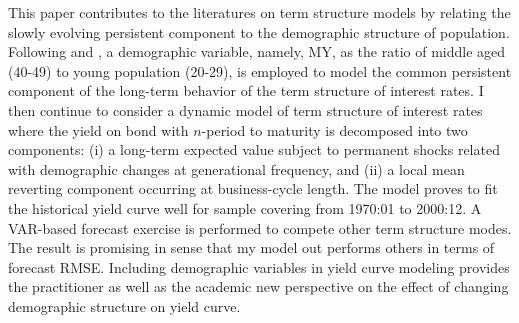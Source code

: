 \begin{englishabstract}
    This paper contributes to the literatures on term structure models by relating the slowly evolving persistent component to the demographic structure of population. Following \cite{geanakoplos2004demography} and \citet{favero2012demographics}, a demographic variable, namely, MY, as the ratio of middle aged (40-49) to young population (20-29), is employed to model the common persistent component of the long-term behavior of the term structure of interest rates. I then continue to consider a dynamic \citeauthor{nelson1987parsimonious} model of term structure of interest rates where the yield on bond with $n$-period to maturity  is decomposed into two components: (i) a long-term expected value subject to permanent shocks related with demographic changes at generational frequency, and (ii) a local mean reverting component occurring at business-cycle length. The model proves to fit the historical yield curve well for sample covering from 1970:01 to 2000:12. A VAR-based forecast exercise is performed to compete other term structure modes. The result is promising in sense that my model out performs others in terms of forecast RMSE. Including demographic variables in yield curve modeling provides the practitioner as well as the academic new perspective on the effect of changing demographic structure on yield curve.\\

\end{englishabstract}
